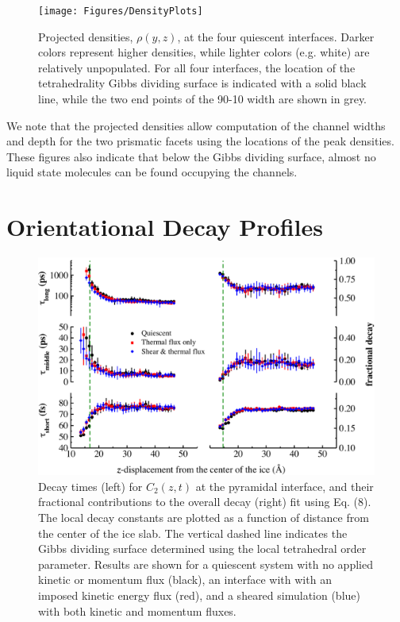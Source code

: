 \begin{figure}
\texttt{[image: Figures/DensityPlots]}
\caption{\label{fig:DensPlots} Projected densities, $\rho(y, z)$, at
  the four quiescent interfaces.  Darker colors represent higher
  densities, while lighter colors (e.g. white) are relatively
  unpopulated.  For all four interfaces, the location of the
  tetrahedrality Gibbs dividing surface is indicated with a solid
  black line, while the two end points of the 90-10 width are shown in
  grey.}
\end{figure}

We note that the projected densities allow computation of the channel
widths and depth for the two prismatic facets using the locations of
the peak densities.  These figures also indicate that below the Gibbs
dividing surface, almost no liquid state molecules can be found
occupying the channels.

\section{Orientational Decay Profiles}

\begin{figure}
\includegraphics[width=\linewidth]{Figures/Pyr_lcorrz}
\caption{\label{fig:Pyrorient} Decay times (left) for $C_2(z,t)$ at
  the pyramidal interface, and their fractional contributions to the
  overall decay (right) fit using Eq. (8). The local decay constants
  are plotted as a function of distance from the center of the ice
  slab. The vertical dashed line indicates the Gibbs dividing surface
  determined using the local tetrahedral order parameter.  Results are
  shown for a quiescent system with no applied kinetic or momentum
  flux (black), an interface with with an imposed kinetic energy flux
  (red), and a sheared simulation (blue) with both kinetic and
  momentum fluxes.}
\end{figure}

